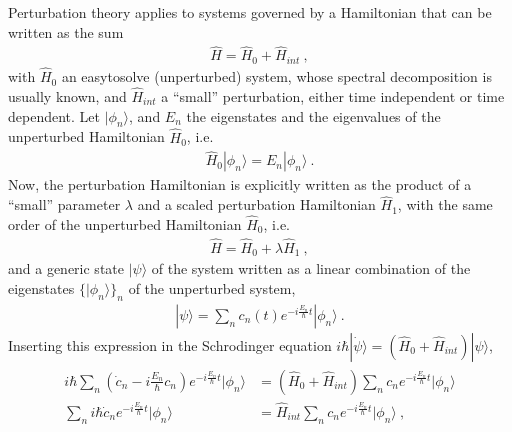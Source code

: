 \documentclass[letterpaper,10pt,english]{jupyterBook}
\begin{document}
\sphinxAtStartPar
Perturbation theory applies to systems governed by a Hamiltonian that can be written as the sum
\begin{equation*}
\begin{split}
\hat H = \hat H_0+\hat H_{int} \ ,
\end{split}
\end{equation*}
\sphinxAtStartPar
with \(\hat H_0\) an easy\sphinxhyphen{}to\sphinxhyphen{}solve (unperturbed) system, whose spectral decomposition is usually known, and \(\hat H_{int}\) a “small” perturbation, either time independent or time dependent. Let \(| \phi_n \rangle\), and \(E_n\) the eigenstates and the eigenvalues of the unperturbed Hamiltonian \(\hat{H}_0\), i.e.
\begin{equation*}
\begin{split}\hat{H}_0 | \phi_n \rangle = E_n | \phi_n \rangle \ .\end{split}
\end{equation*}
\sphinxAtStartPar
Now, the perturbation Hamiltonian is explicitly written as the product of a “small” parameter \(\lambda\) and a scaled perturbation Hamiltonian \(\hat{H}_1\), with the same order of the unperturbed Hamiltonian \(\hat{H}_0\), i.e.
\begin{equation*}
\begin{split}\hat{H} = \hat{H}_0 + \lambda \hat{H}_1 \ ,\end{split}
\end{equation*}
\sphinxAtStartPar
and a generic state \(| \psi \rangle\) of the system written as a linear combination of the eigenstates \(\{ | \phi_n \rangle \}_n\) of the unperturbed system,
\begin{equation*}
\begin{split}
|\psi\rangle=\sum_nc_n(t)e^{-i \frac{E_n}{\hbar} t}|\phi_n\rangle \ .
\end{split}
\end{equation*}
\sphinxAtStartPar
Inserting this expression in the Schrodinger equation \(i\hbar|\dot\psi\rangle=(\hat H_0+\hat H_{int})|\psi\rangle\),
\begin{equation*}
\begin{split}\begin{aligned}
i\hbar\sum_n\left(\dot c_n-i \frac{E_n}{\hbar} c_n \right)e^{-i \frac{E_n}{\hbar} t}|\phi_n\rangle & = (\hat H_0+\hat H_{int})\sum_nc_ne^{-i \frac{E_n}{\hbar} t}|\phi_n\rangle \\
 \sum_n i\hbar\dot c_ne^{-i \frac{E_n}{\hbar} t}|\phi_n\rangle & = \hat H_{int}\sum_n c_n e^{-i \frac{E_n}{\hbar} t}|\phi_n\rangle \ , 
\end{aligned}\end{split}
\end{equation*}
\end{document}
